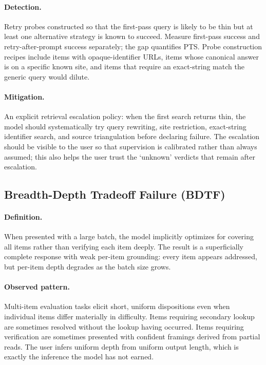 \documentclass[11pt]{article}
\begin{document}
\paragraph{Detection.} Retry probes constructed so that the first-pass query is likely to be thin but at least one alternative strategy is known to succeed. Measure first-pass success and retry-after-prompt success separately; the gap quantifies PTS. Probe construction recipes include items with opaque-identifier URLs, items whose canonical answer is on a specific known site, and items that require an exact-string match the generic query would dilute.

\paragraph{Mitigation.} An explicit retrieval escalation policy: when the first search returns thin, the model should systematically try query rewriting, site restriction, exact-string identifier search, and source triangulation before declaring failure. The escalation should be visible to the user so that supervision is calibrated rather than always assumed; this also helps the user trust the `unknown' verdicts that remain after escalation.

\subsection{Breadth-Depth Tradeoff Failure (BDTF)}
\paragraph{Definition.} When presented with a large batch, the model implicitly optimizes for covering all items rather than verifying each item deeply. The result is a superficially complete response with weak per-item grounding: every item appears addressed, but per-item depth degrades as the batch size grows.

\paragraph{Observed pattern.} Multi-item evaluation tasks elicit short, uniform dispositions even when individual items differ materially in difficulty. Items requiring secondary lookup are sometimes resolved without the lookup having occurred. Items requiring verification are sometimes presented with confident framings derived from partial reads. The user infers uniform depth from uniform output length, which is exactly the inference the model has not earned.
\end{document}
